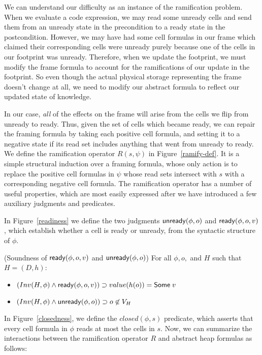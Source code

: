 \documentclass[preprint,natbib]{sigplanconf}
\begin{document}
We can understand our difficulty as an instance of the ramification
problem. When we evaluate a code expression, we may read some unready
cells and send them from an unready state in the precondition to a ready
state in the postcondition. However, we may have had some cell formulas in
our frame which claimed their corresponding cells were unready purely
because one of the cells in our footprint was unready. Therefore, when
we update the footprint, we must modify the frame formula to account
for the ramifications of our update in the footprint. So even though
the actual physical storage representing the frame doesn't change at all, 
we need to modify our abstract formula to reflect our updated state
of knowledge. 

In our case, \emph{all} of the effects on the frame will arise from
the cells we flip from unready to ready. Thus, given the set of cells
which became ready, we can repair the framing formula by taking each
positive cell formula, and setting it to a negative state if its read
set includes anything that went from unready to ready. We define the
ramification operator $R(s, \psi)$ in Figure~\ref{ramify-def}.  It is
a simple structural induction over a framing formula, whose only
action is to replace the positive cell formulas in $\psi$ whose read
sets intersect with $s$ with a corresponding negative cell formula.
The ramification operator has a number of useful properties, which are
most easily expressed after we have introduced a few auxiliary
judgments and predicates.

In Figure~\ref{readiness} we define the two judgments $\mbox{\textsf{{unready}}}({\phi}, {o})$
and $\mbox{\textsf{{ready}}}({\phi}, {o}, {v})$, which establish whether a cell is ready or
unready, from the syntactic structure of $\phi$. 

\begin{prop}{(Soundness of $\mbox{\textsf{{ready}}}({\phi}, {o}, {v})$ and $\mbox{\textsf{{unready}}}({\phi}, {o})$)}
For all $\phi, o,$ and $H$ such that $H = (D,h)$:

\begin{itemize}
\item $(Inv(H, \phi) \land \mbox{\textsf{{ready}}}({\phi}, {o}, {v})) \supset value(h(o)) = \mbox{\textsf{{Some}}}\;v$
\item $(Inv(H, \phi) \land \mbox{\textsf{{unready}}}({\phi}, {o})) \supset o \not\in V_H$
\end{itemize}
\end{prop}

In Figure~\ref{closedness}, we define the $closed(\phi, s)$ predicate,
which asserts that every cell formula in $\phi$ reads at most the
cells in $s$. Now, we can summarize the interactions between the 
ramification operator $R$ and abstract heap formulas as follows: 
\end{document}
